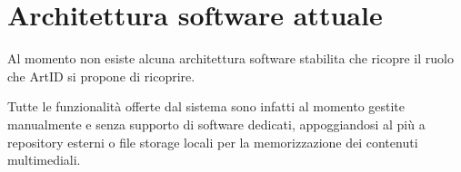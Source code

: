 \section{Architettura software attuale}

Al momento non esiste alcuna architettura software stabilita che ricopre il ruolo che ArtID si propone di ricoprire.

Tutte le funzionalità offerte dal sistema sono infatti al momento gestite manualmente e senza supporto di software dedicati, appoggiandosi al più a repository esterni o file storage locali per la memorizzazione dei contenuti multimediali.